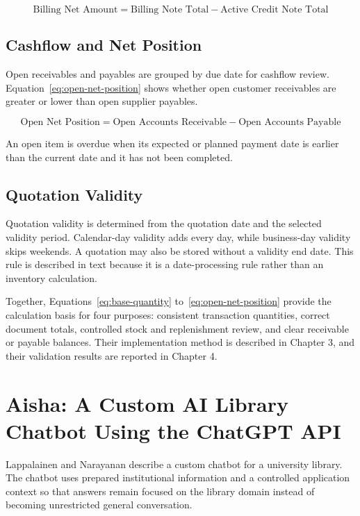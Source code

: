 \begin{equation}
\label{eq:billing-net-amount}
\text{Billing Net Amount} = \text{Billing Note Total}-\text{Active Credit Note Total}
\end{equation}

\subsection{Cashflow and Net Position}
Open receivables and payables are grouped by due date for cashflow review. Equation~\ref{eq:open-net-position} shows whether open customer receivables are greater or lower than open supplier payables.

\begin{equation}
\label{eq:open-net-position}
\text{Open Net Position} = \text{Open Accounts Receivable}-\text{Open Accounts Payable}
\end{equation}

An open item is overdue when its expected or planned payment date is earlier than the current date and it has not been completed.

\subsection{Quotation Validity}
Quotation validity is determined from the quotation date and the selected validity period. Calendar-day validity adds every day, while business-day validity skips weekends. A quotation may also be stored without a validity end date. This rule is described in text because it is a date-processing rule rather than an inventory calculation.

Together, Equations~\ref{eq:base-quantity} to~\ref{eq:open-net-position} provide the calculation basis for four purposes: consistent transaction quantities, correct document totals, controlled stock and replenishment review, and clear receivable or payable balances. Their implementation method is described in Chapter 3, and their validation results are reported in Chapter 4.

\section{Aisha: A Custom AI Library Chatbot Using the ChatGPT API \cite{paper_3}}
Lappalainen and Narayanan describe a custom chatbot for a university library. The chatbot uses prepared institutional information and a controlled application context so that answers remain focused on the library domain instead of becoming unrestricted general conversation.

